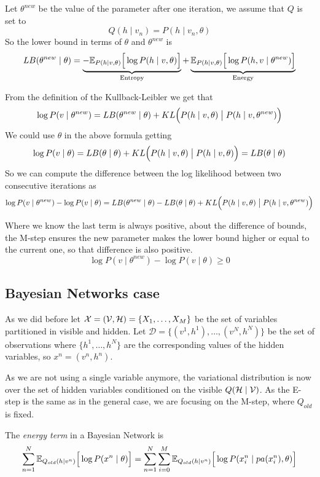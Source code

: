 Let \(\theta^{new}\) be the value of the parameter after one iteration, we assume that \(Q\) is set to
\[
  Q(h \mid v_{n}) = P(h \mid v_{n}, \theta)
\]
So the lower bound in terms of \(\theta\) and \(\theta^{new}\) is
\[
  LB(\theta^{new} \mid \theta) =  \underbrace{-\mathbb{E}_{P(h \mid v, \theta)}\Big[\log{P(h \mid v, \theta)}\Big]}_{\text{Entropy}} + \underbrace{\mathbb{E}_{P(h \mid v, \theta)}\Big[\log{P(h,v \mid \theta^{new})}\Big]}_{\text{Energy}}
\]

From the definition of the Kullback-Leibler we get that
\[
  \log{P(v \mid \theta^{new})} = LB(\theta^{new}\mid \theta) + KL\Big(P(h \mid v, \theta) \bigm| P(h \mid v, \theta^{new})\Big)
\]
We could use \(\theta\) in the above formula getting
\[
  \log{P(v \mid \theta)} = LB(\theta \mid \theta) + KL\Big(P(h \mid v, \theta) \bigm| P(h \mid v, \theta)\Big) = LB(\theta \mid \theta)
\]
So we can compute the difference between the log likelihood between two consecutive iterations as
\[
  \log{P(v \mid \theta^{new})} - \log{P(v \mid \theta)} = LB(\theta^{new}\mid \theta) - LB(\theta \mid \theta) +  KL\Big(P(h \mid v, \theta) \bigm| P(h \mid v, \theta^{new})\Big)
\]

Where we know the last term is always positive, about the difference of bounds, the M-step ensures the new parameter makes the lower bound higher or equal to the current one, so that difference is also positive.
\[
   \log{P(v \mid \theta^{new})} - \log{P(v \mid \theta)} \geq 0
\]

\subsection{Bayesian Networks case}

As we did before let \(\mathcal{X} = (\mathcal{V}, \mathcal{H}) = \{X_{1}, \dots , X_{M}\}\) be the set of variables partitioned in visible and hidden. Let \(\mathcal{D} = \{(v^{1},h^{1}),\dots,(v^{N},h^{N})\}\) be the set of observations where \(\{h^{1},\dots, h^{N}\}\) are the corresponding values of the hidden variables, so \(x^{n} = (v^{n}, h^{n})\).

As we are not using a single variable anymore, the variational distribution is now over the set of hidden variables conditioned on the visible \(Q(\mathcal{H} \mid \mathcal{V})\). As the E-step is the same as in the general case, we are focusing on the M-step, where \(Q_{old}\) is fixed.

The \emph{energy term} in a Bayesian Network is
\[
  \sum_{n=1}^{N} \mathbb{E}_{Q_{old}(h \mid v^{n})}\Big[ \log{P(x^{n} \mid \theta)} \Big] = \sum_{n = 1}^{N}\sum_{i = 0}^{M} \mathbb{E}_{Q_{old}(h \mid v^{n})}\Big[\log{P( x_{i}^{n} \mid pa(x_{i}^{n}), \theta)}\Big]
\]

